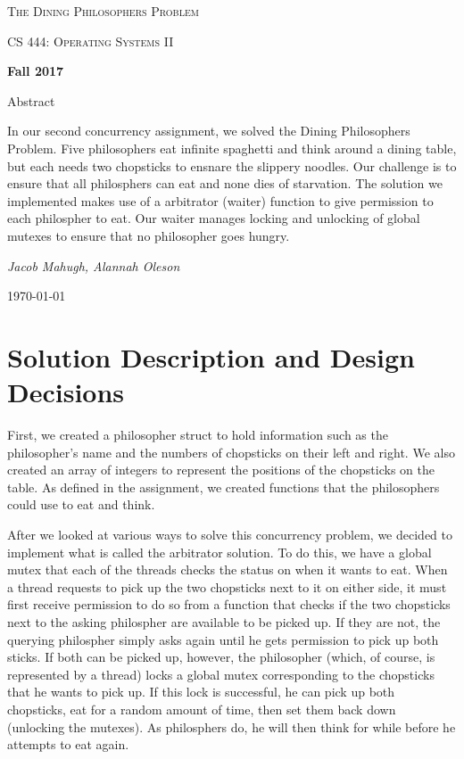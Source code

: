 \documentclass[letterpaper,10pt,titlepage]{article}
\begin{document}
\begin{titlepage}
	\centering
	\vspace*{4cm}
	{\scshape\huge The Dining Philosophers Problem\par}
	\vspace{1cm}
	{\scshape\LARGE CS 444: Operating Systems II\par}
	\vspace{0.5cm}
	{\large\bfseries Fall 2017\par}
	\vspace {1cm}
	{\large Abstract\par}
	\vspace {0.5cm}
	In our second concurrency assignment, we solved the Dining Philosophers Problem.
	Five philosophers eat infinite spaghetti and think around a dining table, but each needs two chopsticks to ensnare the slippery noodles.
	Our challenge is to ensure that all philosphers can eat and none dies of starvation.
	The solution we implemented makes use of a arbitrator (waiter) function to give permission to each philospher to eat.
	Our waiter manages locking and unlocking of global mutexes to ensure that no philosopher goes hungry.
	\par
	\vspace{1cm}
	{\Large\itshape Jacob Mahugh, Alannah Oleson\par}
	\vfill
	{\large \today\par}	

\end{titlepage}



\section {Solution Description and Design Decisions}

First, we created a philosopher struct to hold information such as the philosopher's name and the numbers of chopsticks on their left and right.
We also created an array of integers to represent the positions of the chopsticks on the table.
As defined in the assignment, we created functions that the philosophers could use to eat and think.

After we looked at various ways to solve this concurrency problem, we decided to implement what is called the arbitrator solution. 
To do this, we have a global mutex that each of the threads checks the status on when it wants to eat.
When a thread requests to pick up the two chopsticks next to it on either side, it must first receive permission to do so from a function that
checks if the two chopsticks next to the asking philospher are available to be picked up.
If they are not, the querying philospher simply asks again until he gets permission to pick up both sticks.
If both can be picked up, however, the philosopher (which, of course, is represented by a thread) locks a global mutex corresponding
to the chopsticks that he wants to pick up.
If this lock is successful, he can pick up both chopsticks, eat for a random amount of time, then set them back down (unlocking the mutexes). 
As philosphers do, he will then think for while before he attempts to eat again.
\end{document}
